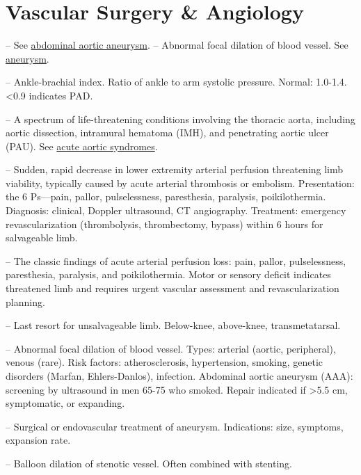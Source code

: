 \chapter{Vascular Surgery \& Angiology}

-- See \hyperlink{Abdominal Aortic Aneurysm}{abdominal aortic aneurysm}.
-- Abnormal focal dilation of blood vessel. See \hyperlink{Aneurysm}{aneurysm}.

-- Ankle-brachial index. Ratio of ankle to arm systolic pressure. Normal: 1.0-1.4. <0.9 indicates PAD.

-- A spectrum of life-threatening conditions involving the thoracic aorta, including aortic dissection, intramural hematoma (IMH), and penetrating aortic ulcer (PAU). See \hyperlink{Acute Aortic Syndromes}{acute aortic syndromes}.

-- Sudden, rapid decrease in lower extremity arterial perfusion threatening limb viability, typically caused by acute arterial thrombosis or embolism. Presentation: the 6 Ps—pain, pallor, pulselessness, paresthesia, paralysis, poikilothermia. Diagnosis: clinical, Doppler ultrasound, CT angiography. Treatment: emergency revascularization (thrombolysis, thrombectomy, bypass) within 6 hours for salvageable limb.

-- The classic findings of acute arterial perfusion loss: pain, pallor, pulselessness, paresthesia, paralysis, and poikilothermia. Motor or sensory deficit indicates threatened limb and requires urgent vascular assessment and revascularization planning.

-- Last resort for unsalvageable limb. Below-knee, above-knee, transmetatarsal.

-- Abnormal focal dilation of blood vessel. Types: arterial (aortic, peripheral), venous (rare). Risk factors: atherosclerosis, hypertension, smoking, genetic disorders (Marfan, Ehlers-Danlos), infection. Abdominal aortic aneurysm (AAA): screening by ultrasound in men 65-75 who smoked. Repair indicated if >5.5 cm, symptomatic, or expanding.

-- Surgical or endovascular treatment of aneurysm. Indications: size, symptoms, expansion rate.

-- Balloon dilation of stenotic vessel. Often combined with stenting.

